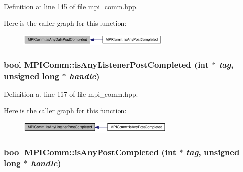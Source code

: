 Definition at line 145 of file mpi\_\-comm.hpp.

Here is the caller graph for this function:\nopagebreak
\begin{figure}[H]
\begin{center}
\leavevmode
\includegraphics[width=213pt]{class_m_p_i_comm_ace0d0f43b30dcb479d387c7d39735cd9_icgraph}
\end{center}
\end{figure}
\hypertarget{class_m_p_i_comm_ae34314bc322812be2fa99db0ad1687a2}{
\subsubsection[{isAnyListenerPostCompleted}]{\setlength{\rightskip}{0pt plus 5cm}bool MPIComm::isAnyListenerPostCompleted (int $\ast$ {\em tag}, \/  unsigned long $\ast$ {\em handle})}}
\label{class_m_p_i_comm_ae34314bc322812be2fa99db0ad1687a2}


Definition at line 167 of file mpi\_\-comm.hpp.

Here is the caller graph for this function:\nopagebreak
\begin{figure}[H]
\begin{center}
\leavevmode
\includegraphics[width=220pt]{class_m_p_i_comm_ae34314bc322812be2fa99db0ad1687a2_icgraph}
\end{center}
\end{figure}
\hypertarget{class_m_p_i_comm_a897fbe8d99735dec4088197b9c4f2a23}{
\subsubsection[{isAnyPostCompleted}]{\setlength{\rightskip}{0pt plus 5cm}bool MPIComm::isAnyPostCompleted (int $\ast$ {\em tag}, \/  unsigned long $\ast$ {\em handle})}}
\label{class_m_p_i_comm_a897fbe8d99735dec4088197b9c4f2a23}


